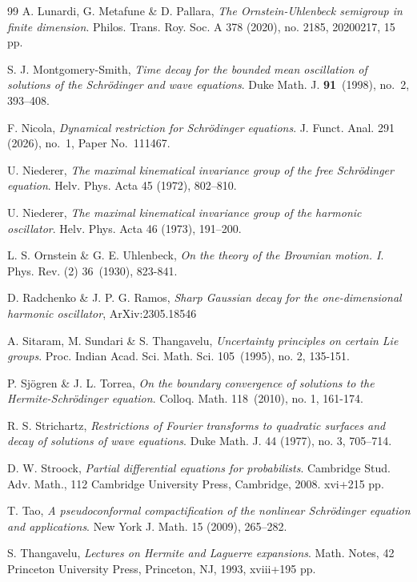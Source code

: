 \documentclass[11pt,a4paper]{amsart}
\numberwithin{equation}{section}
\numberwithin{equation}{section}
\begin{document}
\begin{thebibliography}{99}
A. Lunardi, G. Metafune \& D. Pallara, \emph{The Ornstein-Uhlenbeck semigroup in finite dimension}.
Philos. Trans. Roy. Soc. A 378 (2020), no. 2185, 20200217, 15 pp.

S. J. Montgomery-Smith, \emph{Time decay for the bounded mean oscillation of solutions of the Schr\"odinger and wave equations}.
Duke Math. J. \textbf{91}~(1998), no.~2, 393--408.

F. Nicola, \emph{Dynamical restriction for Schr\"odinger equations}.
J. Funct. Anal. 291 (2026), no.~1, Paper No.~111467.

U. Niederer, \emph{The maximal kinematical invariance group of the free Schr\"odinger equation}.
Helv. Phys. Acta 45 (1972), 802--810.

U. Niederer, \emph{The maximal kinematical invariance group of the harmonic oscillator}.
Helv. Phys. Acta 46 (1973), 191--200.

L. S. Ornstein \& G. E. Uhlenbeck, \emph{On the theory of the Brownian motion. I}.
Phys. Rev. (2) 36~(1930), 823-841.

D. Radchenko \& J. P. G. Ramos, \emph{Sharp Gaussian decay for the one-dimensional harmonic oscillator}, ArXiv:2305.18546

A. Sitaram, M. Sundari \& S. Thangavelu, \emph{Uncertainty principles on certain Lie groups}.
Proc. Indian Acad. Sci. Math. Sci. 105~(1995), no. 2, 135-151.

P. Sj\"ogren \& J. L. Torrea, \emph{On the boundary convergence of solutions to the Hermite-Schr\"odinger equation}.
Colloq. Math. 118~(2010), no. 1, 161-174.

R. S. Strichartz, \emph{Restrictions of Fourier transforms to quadratic surfaces and decay of solutions of wave equations}.
Duke Math. J. 44 (1977), no. 3, 705--714.

D. W. Stroock, \emph{Partial differential equations for probabilists}.
Cambridge Stud. Adv. Math., 112
Cambridge University Press, Cambridge, 2008. xvi+215 pp.

T. Tao, \emph{A pseudoconformal compactification of the nonlinear Schr\"odinger equation and applications}.
New York J. Math. 15 (2009), 265--282.

S. Thangavelu, \emph{Lectures on Hermite and Laguerre expansions}.
Math. Notes, 42
Princeton University Press, Princeton, NJ, 1993, xviii+195 pp.


\end{thebibliography}
\end{document}
